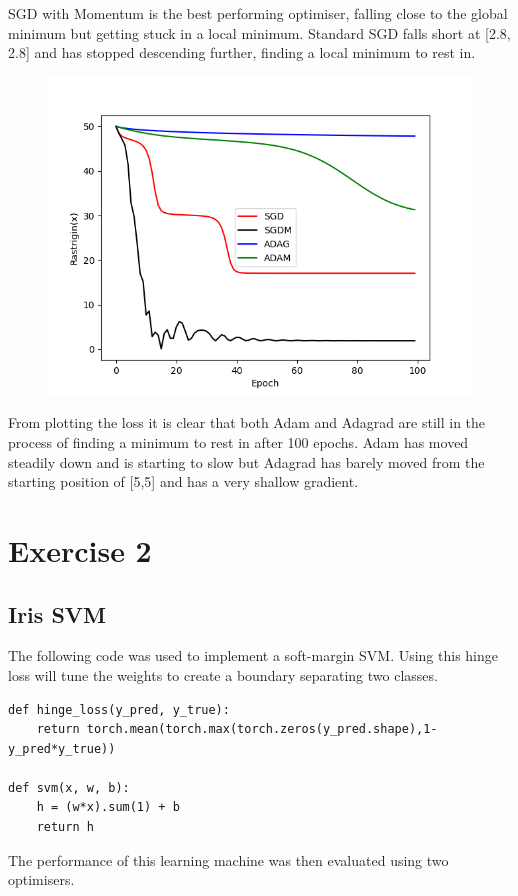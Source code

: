 \documentclass[sigconf]{acmart}
\begin{document}
SGD with Momentum is the best performing optimiser, falling close to the global minimum but getting stuck in a local minimum. 
Standard SGD falls short at [2.8, 2.8] and has stopped descending further, finding a local minimum to rest in.
\begin{figure}[H]
    \centering
    \includegraphics[scale=0.5]{"../optimisers.png"}
\end{figure}
From plotting the loss it is clear that both Adam and Adagrad are still in the process of finding a minimum to rest in after 100 epochs. 
Adam has moved steadily down and is starting to slow but Adagrad has barely moved from the starting position of [5,5] and has a very shallow gradient.

\section{Exercise 2}
\subsection{Iris SVM}
The following code was used to implement a soft-margin SVM. Using this hinge loss will tune the weights to create a boundary separating two classes.
\begin{listing}[H]
    \begin{verbatim}
def hinge_loss(y_pred, y_true):
    return torch.mean(torch.max(torch.zeros(y_pred.shape),1-y_pred*y_true))

def svm(x, w, b):
    h = (w*x).sum(1) + b
    return h
    \end{verbatim}
\end{listing}
The performance of this learning machine was then evaluated using two optimisers.
\end{document}
